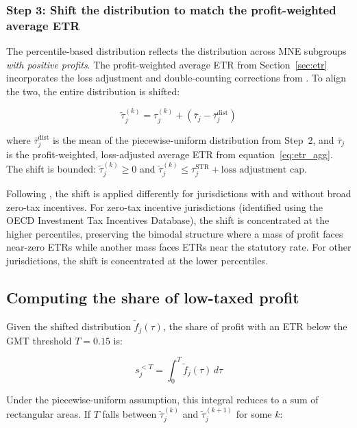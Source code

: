\documentclass[11pt,a4paper]{article}
\begin{document}
\subsubsection{Step 3: Shift the distribution to match the profit-weighted average ETR}

The percentile-based distribution reflects the distribution across MNE subgroups \emph{with positive profits}. The profit-weighted average ETR from Section~\ref{sec:etr} incorporates the loss adjustment and double-counting corrections from \citet{hugger2025}. To align the two, the entire distribution is shifted:

\begin{equation}\label{eq:shift}
\tilde{\tau}_j^{(k)} = \tau_j^{(k)} + \left(\bar{\tau}_j - \bar{\tau}_j^{\text{dist}}\right)
\end{equation}

where $\bar{\tau}_j^{\text{dist}}$ is the mean of the piecewise-uniform distribution from Step~2, and $\bar{\tau}_j$ is the profit-weighted, loss-adjusted average ETR from equation~\eqref{eq:etr_agg}. The shift is bounded: $\tilde{\tau}_j^{(k)} \geq 0$ and $\tilde{\tau}_j^{(k)} \leq \tau_j^{\text{STR}} + \text{loss adjustment cap}$.

Following \citet{hugger2025}, the shift is applied differently for jurisdictions with and without broad zero-tax incentives. For zero-tax incentive jurisdictions (identified using the OECD Investment Tax Incentives Database), the shift is concentrated at the higher percentiles, preserving the bimodal structure where a mass of profit faces near-zero ETRs while another mass faces ETRs near the statutory rate. For other jurisdictions, the shift is concentrated at the lower percentiles.

\subsection{Computing the share of low-taxed profit}\label{sec:lowtaxed}

Given the shifted distribution $\tilde{f}_j(\tau)$, the share of profit with an ETR below the GMT threshold $T = 0.15$ is:

\begin{equation}\label{eq:lowtax_share}
s_j^{<T} = \int_0^{T} \tilde{f}_j(\tau) \, d\tau
\end{equation}

Under the piecewise-uniform assumption, this integral reduces to a sum of rectangular areas. If $T$ falls between $\tilde{\tau}_j^{(k)}$ and $\tilde{\tau}_j^{(k+1)}$ for some $k$:
\end{document}
